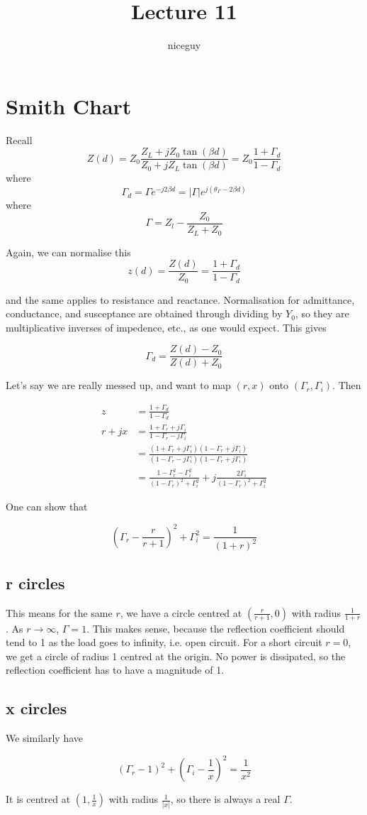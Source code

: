 \documentclass[12pt]{article}
\title{Lecture 11}
\author{niceguy}
\begin{document}
\maketitle

\section{Smith Chart}

Recall
$$Z(d) = Z_0\frac{Z_L + jZ_0\tan(\beta d)}{Z_0 + jZ_L\tan(\beta d)} = Z_0 \frac{1 + \Gamma_d}{1 - \Gamma_d}$$
where
$$\Gamma_d = \Gamma e^{-j2\beta d} = |\Gamma| e^{j(\theta_\Gamma - 2\beta d)}$$
where
$$\Gamma = Z_l-\frac{Z_0}{Z_L+Z_0}$$

Again, we can normalise this
$$z(d) = \frac{Z(d)}{Z_0} = \frac{1+\Gamma_d}{1-\Gamma_d}$$

and the same applies to resistance and reactance. Normalisation for admittance, conductance, and susceptance are obtained through dividing by $Y_0$, so they are multiplicative inverses of impedence, etc., as one would expect. This gives

$$\Gamma_d = \frac{Z(d)-Z_0}{Z(d)+Z_0}$$

Let's say we are really messed up, and want to map $(r,x)$ onto $(\Gamma_r,\Gamma_i)$. Then

\begin{align*}
    z &= \frac{1+\Gamma_d}{1 - \Gamma_d} \\
    r + jx &= \frac{1 + \Gamma_r + j\Gamma_i}{1 - \Gamma_r - j\Gamma_i} \\
           &= \frac{(1 + \Gamma_r + j\Gamma_i)(1 - \Gamma_r + j\Gamma_i)}{(1 - \Gamma_r - j\Gamma_i)(1 - \Gamma_r + j\Gamma_i)} \\
           &= \frac{1 - \Gamma_r^2 - \Gamma_i^2}{(1 - \Gamma_r)^2 + \Gamma_i^2} + j\frac{2\Gamma_i}{(1 - \Gamma_r)^2 + \Gamma_i^2}
\end{align*}

One can show that

$$\left(\Gamma_r - \frac{r}{r+1}\right)^2 + \Gamma_i^2 = \frac{1}{(1+r)^2}$$

\subsection{r circles}

This means for the same $r$, we have a circle centred at $\left(\frac{r}{r+1}, 0\right)$ with radius $\frac{1}{1+r}$. As $r \rightarrow \infty$, $\Gamma = 1$. This makes sense, because the reflection coefficient should tend to 1 as the load goes to infinity, i.e. open circuit. For a short circuit $r = 0$, we get a circle of radius 1 centred at the origin. No power is dissipated, so the reflection coefficient has to have a magnitude of 1.

\subsection{x circles}

We similarly have

$$(\Gamma_r - 1)^2 + \left(\Gamma_i - \frac{1}{x}\right)^2 = \frac{1}{x^2}$$

It is centred at $\left(1, \frac{1}{x}\right)$ with radius $\frac{1}{|x|}$, so there is always a real $\Gamma$.
\end{document}
